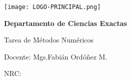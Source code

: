 \documentclass{article}
\date{}
\begin{document}
\begin{center}
\texttt{[image: LOGO-PRINCIPAL.png]}

\vspace{0.25cm}
{\textbf {Departamento de Ciencias Exactas}}

Tarea de Métodos Numéricos

Docente: Mgs.Fabián Ordóñez M.

NRC:



\end{center}
\end{document}
